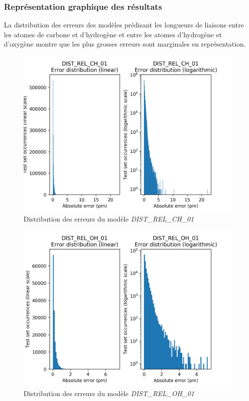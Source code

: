 \subsubsection{Représentation graphique des résultats}

\par La distribution des erreurs des modèles prédisant les longueurs de liaisons entre les atomes de carbone et d'hydrogène et entre les atomes d'hydrogène et d'oxygène montre que les plus grosses erreurs sont marginales en représentation. \\


\begin{figure}[!h]
	\centering
	
	\includegraphics[scale=0.7]{../figures/DIST_REL_CH_01/DIST_REL_CH_01_distrib_rmse_val.png}	
	
	\caption{Distribution des erreurs du modèle \emph{DIST\_REL\_CH\_01}}
\end{figure}

\begin{figure}[!h]
	\centering
	
	\includegraphics[scale=0.7]{../figures/DIST_REL_OH_01/DIST_REL_OH_01_distrib_rmse_val.png}	
	
	\caption{Distribution des erreurs du modèle \emph{DIST\_REL\_OH\_01}}
\end{figure}

